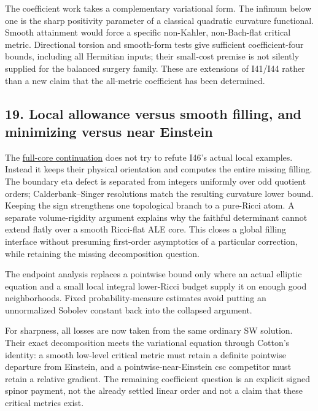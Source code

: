 \documentclass[
  10pt,
]{article}
\begin{document}
The coefficient work takes a complementary variational form. The infimum
below one is the sharp positivity parameter of a classical quadratic
curvature functional. Smooth attainment would force a specific
non-Kahler, non-Bach-flat critical metric. Directional torsion and
smooth-form tests give sufficient coefficient-four bounds, including all
Hermitian inputs; their small-cost premise is not silently supplied for
the balanced surgery family. These are extensions of I41/I44 rather than
a new claim that the all-metric coefficient has been determined.

\hypertarget{local-allowance-versus-smooth-filling-and-minimizing-versus-near-einstein}{%
\subsection{19. Local allowance versus smooth filling, and minimizing
versus near
Einstein}\label{local-allowance-versus-smooth-filling-and-minimizing-versus-near-einstein}}

The
\href{../continuation/20260927_full_core_cost_and_extremal_metrics.md}{full-core
continuation} does not try to refute I46's actual local examples.
Instead it keeps their physical orientation and computes the entire
missing filling. The boundary eta defect is separated from integers
uniformly over odd quotient orders; Calderbank--Singer resolutions match
the resulting curvature lower bound. Keeping the sign strengthens one
topological branch to a pure-Ricci atom. A separate volume-rigidity
argument explains why the faithful determinant cannot extend flatly over
a smooth Ricci-flat ALE core. This closes a global filling interface
without presuming first-order asymptotics of a particular correction,
while retaining the missing decomposition question.

The endpoint analysis replaces a pointwise bound only where an actual
elliptic equation and a small local integral lower-Ricci budget supply
it on enough good neighborhoods. Fixed probability-measure estimates
avoid putting an unnormalized Sobolev constant back into the collapsed
argument.

For sharpness, all losses are now taken from the same ordinary SW
solution. Their exact decomposition meets the variational equation
through Cotton's identity: a smooth low-level critical metric must
retain a definite pointwise departure from Einstein, and a
pointwise-near-Einstein csc competitor must retain a relative gradient.
The remaining coefficient question is an explicit signed spinor payment,
not the already settled linear order and not a claim that these critical
metrics exist.
\end{document}
